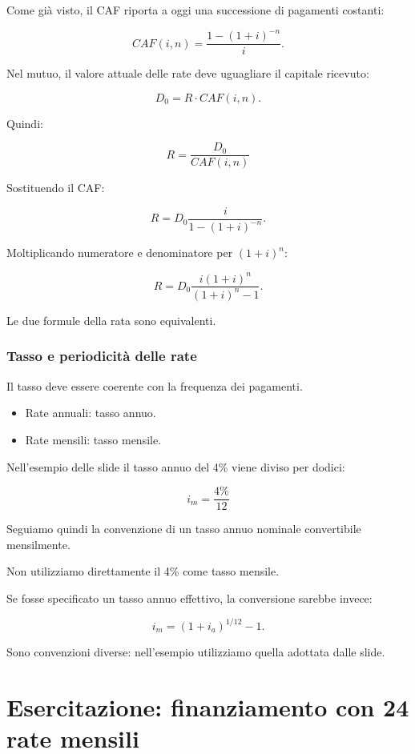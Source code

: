 \noindent Come già visto,
il CAF riporta a oggi
una successione di pagamenti costanti:

\[
CAF(i,n)
=
\frac{1-(1+i)^{-n}}{i}.
\]

\noindent Nel mutuo,
il valore attuale delle rate
deve uguagliare il capitale ricevuto:

\[
D_0=R\cdot CAF(i,n).
\]

\noindent Quindi:

\[
\boxed{
R=\frac{D_0}{CAF(i,n)}
}
\]

\noindent Sostituendo il CAF:

\[
R=
D_0
\frac{i}{1-(1+i)^{-n}}.
\]

\noindent Moltiplicando numeratore
e denominatore per $(1+i)^n$:

\[
R=
D_0
\frac{i(1+i)^n}
{(1+i)^n-1}.
\]

\noindent Le due formule della rata
sono equivalenti.


\subsubsection*{Tasso e periodicità delle rate}

\noindent Il tasso deve essere coerente
con la frequenza dei pagamenti.

\begin{itemize}
    \item Rate annuali:
    tasso annuo.

    \item Rate mensili:
    tasso mensile.
\end{itemize}

\noindent Nell'esempio delle slide
il tasso annuo del 4\%
viene diviso per dodici:

\[
\boxed{
i_m=\frac{4\%}{12}
}
\]

\noindent Seguiamo quindi
la convenzione di un tasso annuo nominale
convertibile mensilmente.

\noindent Non utilizziamo direttamente
il 4\% come tasso mensile.

\medskip

\noindent Se fosse specificato
un tasso annuo effettivo,
la conversione sarebbe invece:

\[
i_m=(1+i_a)^{1/12}-1.
\]

\noindent Sono convenzioni diverse:
nell'esempio utilizziamo
quella adottata dalle slide.


\section{Esercitazione:
finanziamento con 24 rate mensili}

